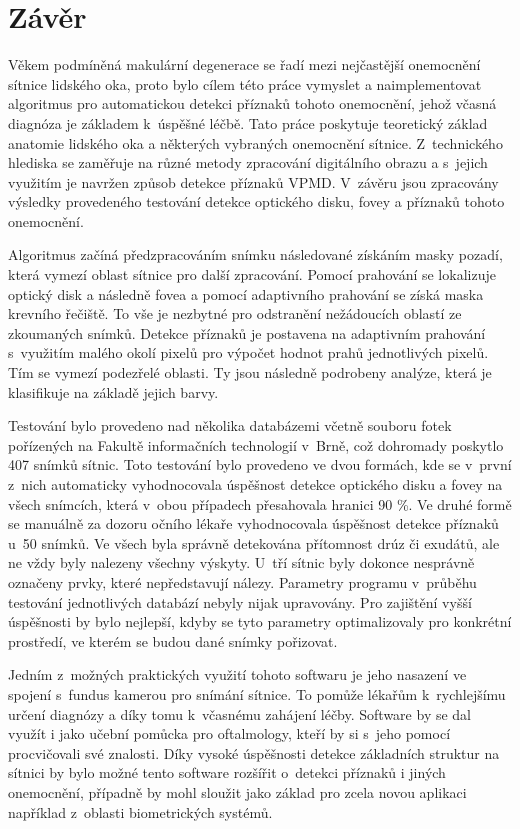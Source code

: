 \chapter{Závěr}
Věkem podmíněná makulární degenerace se řadí mezi nejčastější onemocnění sítnice lidského oka, proto bylo cílem této práce vymyslet a naimplementovat algoritmus pro automatickou detekci příznaků tohoto onemocnění, jehož včasná diagnóza je základem k~úspěšné léčbě. Tato práce poskytuje teoretický základ anatomie lidského oka a některých vybraných onemocnění sítnice. Z~technického hlediska se zaměřuje na různé metody zpracování digitálního obrazu a s~jejich využitím je navržen způsob detekce příznaků VPMD. V~závěru jsou zpracovány výsledky provedeného testování detekce optického disku, fovey a příznaků tohoto onemocnění.

Algoritmus začíná předzpracováním snímku následované získáním masky pozadí, která vymezí oblast sítnice pro další zpracování. Pomocí prahování se lokalizuje optický disk a následně fovea a pomocí adaptivního prahování se získá maska krevního řečiště. To vše je nezbytné pro odstranění nežádoucích oblastí ze zkoumaných snímků. Detekce příznaků je postavena na adaptivním prahování s~využitím malého okolí pixelů pro výpočet hodnot prahů jednotlivých pixelů. Tím se vymezí podezřelé oblasti. Ty jsou následně podrobeny analýze, která je klasifikuje na základě jejich barvy.

Testování bylo provedeno nad několika databázemi včetně souboru fotek pořízených na Fakultě informačních technologií v~Brně, což dohromady poskytlo 407 snímků sítnic. Toto testování bylo provedeno ve dvou formách, kde se v~první z~nich automaticky vyhodnocovala úspěšnost detekce optického disku a fovey na všech snímcích, která v~obou případech přesahovala hranici 90 \%. Ve druhé formě se manuálně za dozoru očního lékaře vyhodnocovala úspěšnost detekce příznaků u~50 snímků. Ve všech byla správně detekována přítomnost drúz či exudátů, ale ne vždy byly nalezeny všechny výskyty. U~tří sítnic byly dokonce nesprávně označeny prvky, které nepředstavují nálezy. Parametry programu v~průběhu testování jednotlivých databází nebyly nijak upravovány. Pro zajištění vyšší úspěšnosti by bylo nejlepší, kdyby se tyto parametry optimalizovaly pro konkrétní prostředí, ve kterém se budou dané snímky pořizovat.

Jedním z~možných praktických využití tohoto softwaru je jeho nasazení ve spojení s~fundus kamerou pro snímání sítnice. To pomůže lékařům k~rychlejšímu určení diagnózy a díky tomu k~včasnému zahájení léčby. Software by se dal využít i jako učební pomůcka pro oftalmology, kteří by si s~jeho pomocí procvičovali své znalosti. Díky vysoké úspěšnosti detekce základních struktur na sítnici by bylo možné tento software rozšířit o~detekci příznaků i jiných onemocnění, případně by mohl sloužit jako základ pro zcela novou aplikaci například z~oblasti biometrických systémů.